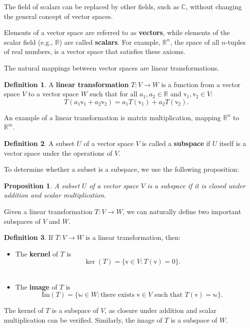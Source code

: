 \documentclass[
]{book}
\providecommand{\tightlist}{%
  \setlength{\itemsep}{0pt}\setlength{\parskip}{0pt}}
\newtheorem{proposition}{Proposition}[chapter]
\theoremstyle{definition}
\newtheorem{definition}{Definition}[chapter]
\theoremstyle{definition}
\theoremstyle{definition}
\theoremstyle{definition}
\theoremstyle{remark}
\begin{document}
The field of scalars can be replaced by other fields, such as \(\mathbb{C}\), without changing the general concept of vector spaces.

Elements of a vector space are referred to as \textbf{vectors}, while elements of the scalar field (e.g., \(\mathbb{R}\)) are called \textbf{scalars}. For example, \(\mathbb{R}^n\), the space of all \(n\)-tuples of real numbers, is a vector space that satisfies these axioms.

The natural mappings between vector spaces are linear transformations.

\begin{definition}
A \textbf{linear transformation} \(T : V \to W\) is a function from a vector space \(V\) to a vector space \(W\) such that for all \(a_1, a_2 \in \mathbb{R}\) and \(\mathbb{v}_1, \mathbb{v}_2 \in V\):\\
\[
T(a_1 \mathbb{v}_1 + a_2 \mathbb{v}_2) = a_1 T(\mathbb{v}_1) + a_2 T(\mathbb{v}_2).
\]

An example of a linear transformation is matrix multiplication, mapping \(\mathbb{R}^n\) to \(\mathbb{R}^m\).
\end{definition}

\begin{definition}
A subset \(U\) of a vector space \(V\) is called a \textbf{subspace} if \(U\) itself is a vector space under the operations of \(V\).

To determine whether a subset is a subspace, we use the following proposition:
\end{definition}

\begin{proposition}
A subset \(U\) of a vector space \(V\) is a subspace if it is closed under addition and scalar multiplication.
\end{proposition}

Given a linear transformation \(T : V \to W\), we can naturally define two important subspaces of \(V\) and \(W\).

\begin{definition}
If \(T : V \to W\) is a linear transformation, then:

\begin{itemize}
\tightlist
\item
  The \textbf{kernel} of \(T\) is\\
  \[
  \ker(T) = \{ \mathbb{v} \in V : T(\mathbb{v}) = 0 \}.
  \]\\
\item
  The \textbf{image} of \(T\) is\\
  \[
  \text{Im}(T) = \{ \mathbb{w} \in W : \text{there exists } \mathbb{v} \in V \text{ such that } T(\mathbb{v}) = \mathbb{w} \}.
  \]
\end{itemize}

The kernel of \(T\) is a subspace of \(V\), as closure under addition and scalar multiplication can be verified. Similarly, the image of \(T\) is a subspace of \(W\).
\end{definition}
\end{document}
